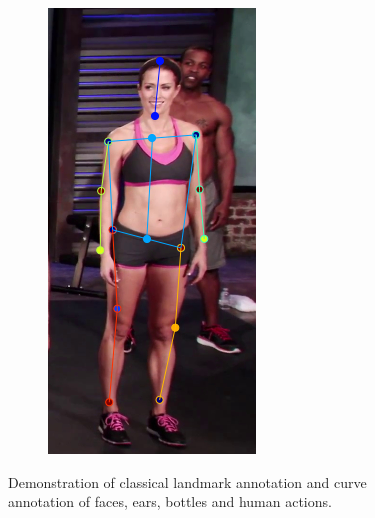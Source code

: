 \begin{figure}[t!]
\begin{subfigure}[b]{0.115\textwidth}
            \includegraphics[width=\textwidth]{resources/MotivativeAnnotation/MPII/bad_anno-4}
    \end{subfigure}
    
    \caption{Demonstration of classical landmark annotation and curve annotation of faces, ears, bottles and human actions.}
    \label{fig:intro}
\end{figure}


